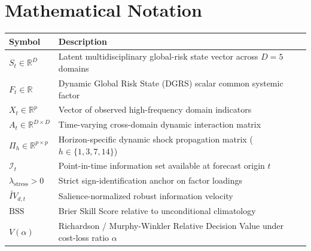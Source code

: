 \documentclass[12pt,oneside,a4paper]{report}
\begin{document}
\chapter*{Mathematical Notation}
\begin{tabularx}{\textwidth}{lX}
\toprule
\textbf{Symbol} & \textbf{Description} \\
\midrule
$S_t \in \mathbb{R}^D$ & Latent multidisciplinary global-risk state vector across $D=5$ domains \\
$F_t \in \mathbb{R}$ & Dynamic Global Risk State (DGRS) scalar common systemic factor \\
$X_t \in \mathbb{R}^p$ & Vector of observed high-frequency domain indicators \\
$A_t \in \mathbb{R}^{D \times D}$ & Time-varying cross-domain dynamic interaction matrix \\
$\Pi_h \in \mathbb{R}^{p \times p}$ & Horizon-specific dynamic shock propagation matrix ($h \in \{1, 3, 7, 14\}$) \\
$\mathcal{I}_t$ & Point-in-time information set available at forecast origin $t$ \\
$\lambda_{\text{stress}} > 0$ & Strict sign-identification anchor on factor loadings \\
$\widetilde{IV}_{d,t}$ & Salience-normalized robust information velocity \\
$\text{BSS}$ & Brier Skill Score relative to unconditional climatology \\
$V(\alpha)$ & Richardson / Murphy-Winkler Relative Decision Value under cost-loss ratio $\alpha$ \\
\bottomrule
\end{tabularx}













\appendix


\end{document}
